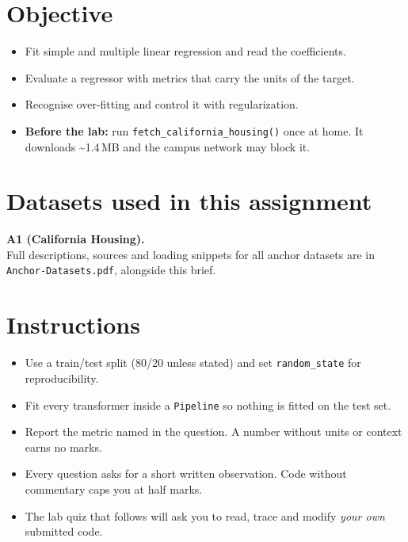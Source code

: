 \documentclass[11pt,a4paper]{article}
\begin{document}

\section*{Objective}

\begin{itemize}[leftmargin=*]

  \item Fit simple and multiple linear regression and read the coefficients.

  \item Evaluate a regressor with metrics that carry the units of the target.

  \item Recognise over-fitting and control it with regularization.

  \item \textbf{Before the lab:} run \texttt{fetch\_california\_housing()} once at home. It downloads \textasciitilde1.4\,MB and the campus network may block it.

\end{itemize}

\section*{Datasets used in this assignment}

\textbf{A1 (California Housing).}\\ Full descriptions, sources and loading snippets for all anchor datasets are in \texttt{Anchor-Datasets.pdf}, alongside this brief.

\section*{Instructions}

\begin{itemize}[leftmargin=*]

  \item Use a train/test split (80/20 unless stated) and set \texttt{random\_state} for reproducibility.

  \item Fit every transformer inside a \texttt{Pipeline} so nothing is fitted on the test set.

  \item Report the metric named in the question. A number without units or context earns no marks.

  \item Every question asks for a short written observation. Code without commentary caps you at half marks.

  \item The lab quiz that follows will ask you to read, trace and modify \emph{your own} submitted code.

\end{itemize}
\end{document}
